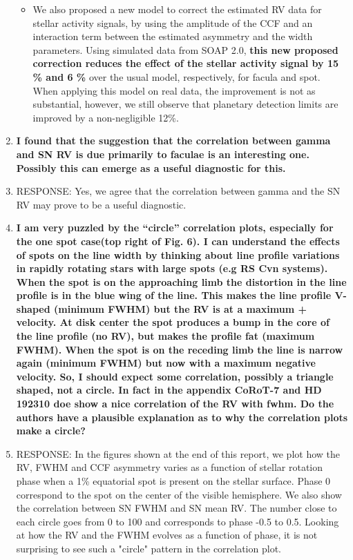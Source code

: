 \documentclass[11pt]{article}   	%
\begin{document}
\begin{enumerate}
\begin{itemize}
\item We also proposed a new model to correct the estimated RV data for stellar activity signals, by using the amplitude of the CCF and an interaction term between the estimated asymmetry and the width parameters. Using simulated data from SOAP 2.0, {\bf{this new proposed correction reduces the effect of the stellar activity signal by 15 \% and 6 \%}} over the usual model, respectively, for facula and spot. When applying this model on real data, the improvement is not as substantial, however, we still observe that planetary detection limits are improved by a non-negligible 12\%.
\end{itemize}


\bigskip
%
%
\item {\bf I found that the suggestion that the correlation between gamma and SN RV is due primarily to faculae is an interesting one. Possibly this can emerge as a useful diagnostic for this.}
%
\item[]  RESPONSE:  Yes, we agree that the correlation between gamma and the SN RV may prove to be a useful diagnostic.
\bigskip
%
%
\item {\bf I am very puzzled by the ``circle'' correlation plots, especially for the one spot case(top right of Fig. 6). I can understand the effects of spots on the line width by thinking about line profile variations in rapidly rotating stars with large spots (e.g RS Cvn systems). When the spot is on the approaching limb the distortion in the line profile is in the blue wing of the line. This makes the line profile V-shaped (minimum FWHM) but the RV is at a maximum + velocity. At disk center the spot produces a bump in the core of the line profile (no RV), but makes the profile fat (maximum FWHM). When the spot is on the receding limb the line is narrow again (minimum FWHM) but now with a maximum negative velocity. So, I should expect some correlation, possibly a triangle shaped, not a circle. In fact in the appendix CoRoT-7 and HD 192310 doe show a nice correlation of the RV with fwhm. Do the authors have a plausible explanation as to why the correlation plots make a circle?}
%
\item[]  RESPONSE:  In the figures shown at the end of this report, we plot how the RV, FWHM and CCF asymmetry varies as a function of stellar rotation phase when a 1\% equatorial spot is present on the stellar surface. Phase 0 correspond to the spot on the center of the visible hemisphere. We also show the correlation between SN FWHM and SN mean RV. The number close to each circle goes from 0 to 100 and corresponds to phase -0.5 to 0.5. Looking at how the RV and the FWHM evolves as a function of phase, it is not surprising to see such a "circle" pattern in the correlation plot.


\end{enumerate}
\end{document}
